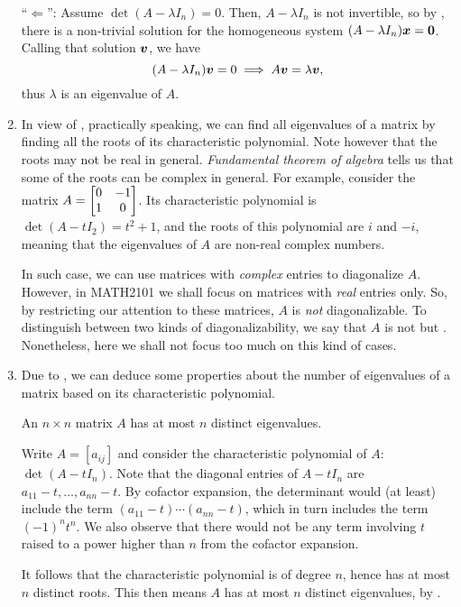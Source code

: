 \begin{enumerate}
\begin{pf}
``\(\Leftarrow\)'': Assume \(\det(A-\lambda I_n)=0\). Then, \(A-\lambda I_n\)
is not invertible, so by , there is a
non-trivial solution for the homogeneous system \((A-\lambda
I_n)\vb*{x}=\vb*{0}\). Calling that solution \(\vb*{v}\), we have
\[
(A-\lambda I_n)\vb*{v}=0\implies A\vb*{v}=\lambda\vb*{v},
\]
thus \(\lambda\) is an eigenvalue of \(A\).
\end{pf}

\item In view of , practically speaking, we
can find all eigenvalues of a matrix by finding all the roots of its
characteristic polynomial. Note however that the roots may not be real in
general. \emph{Fundamental theorem of algebra} tells us that some of the roots
can be complex in general. For example, consider the matrix \(A=\mqty[0&-1\\
1&0]\). Its characteristic polynomial is \(\det(A-tI_2)=t^2+1\), and the roots
of this polynomial are \(i\) and \(-i\), meaning that the eigenvalues of \(A\)
are non-real complex numbers.

In such case, we can use matrices with \emph{complex} entries to diagonalize
\(A\). However, in MATH2101 we shall focus on matrices with \emph{real} entries
only. So, by restricting our attention to these matrices, \(A\) is \emph{not}
diagonalizable. To distinguish between two kinds of diagonalizability, we say
that \(A\) is not  but . Nonetheless, here we shall not focus too much on this kind of
cases.

\item Due to , we can deduce some properties
about the number of eigenvalues of a matrix based on its characteristic
polynomial.

\begin{proposition}
\label{prp:at-most-n-eigenval}
An \(n\times n\) matrix \(A\) has at most \(n\) distinct eigenvalues.
\end{proposition}
\begin{pf}
Write \(A=[a_{ij}]\) and consider the characteristic polynomial of \(A\):
\(\det(A-tI_n)\). Note that the diagonal entries of \(A-tI_n\) are
\(a_{11}-t,\dotsc,a_{nn}-t\). By cofactor expansion, the determinant would
(at least) include the term \((a_{11}-t)\dotsb (a_{nn}-t)\), which in turn
includes the term \((-1)^{n}t^{n}\). We also observe that there would not be
any term involving \(t\) raised to a power higher than \(n\) from the cofactor
expansion.

It follows that the characteristic polynomial is of degree \(n\), hence has at
most \(n\) distinct roots. This then means \(A\) has at most \(n\) distinct
eigenvalues, by .
\end{pf}
\end{enumerate}
